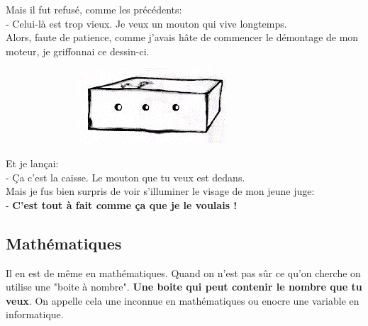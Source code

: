 \documentclass[12pt]{article}
\begin{document}
\begin{multicols}{2}
  Mais il fut refusé, comme les précédents: \\
  - Celui-là est trop vieux. Je veux un mouton qui vive longtemps. \\
  Alors, faute de patience, comme j'avais hâte de commencer le démontage de mon moteur, je griffonnai ce dessin-ci.
  
  \begin{figure}[H]
        \centering
        \includegraphics[width=0.5\linewidth]{3x2-calcul-litteral-1/sources/dm-mouton4.png}
  \end{figure}

  Et je lançai: \\
  - Ça c'est la caisse. Le mouton que tu veux est dedans. \\
  Mais je fus bien surpris de voir s'illuminer le visage de mon jeune juge: \\
  - \textbf{C'est tout à fait comme ça que je le voulais ! }
\end{multicols}

\subsection*{Mathématiques}
Il en est de même en mathématiques. Quand on n’est pas sûr ce qu’on cherche on utilise une "boite à nombre". \textbf{Une boite qui peut contenir le nombre que tu veux}. On appelle cela une inconnue en mathématiques ou enocre une variable en informatique. \\

\vspace{0.4cm}
\end{document}
